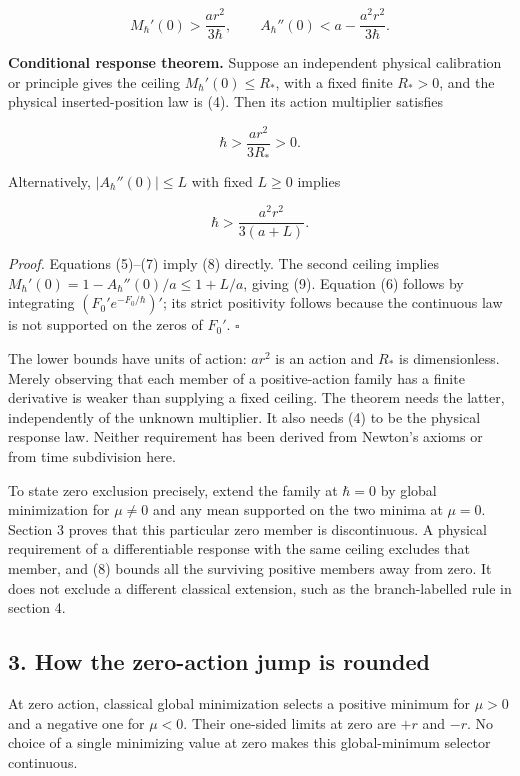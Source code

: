 \documentclass[11pt,a4paper]{article}
\begin{document}
\[
 M_\hbar'(0)>\frac{ar^2}{3\hbar},\qquad
 A_\hbar''(0)<a-\frac{a^2r^2}{3\hbar}.
 \tag{7}
\]

\textbf{Conditional response theorem.} Suppose an independent physical
calibration or principle gives the ceiling \(M_\hbar'(0)\le R_*\), with
a fixed finite \(R_*>0\), and the physical inserted-position law is (4).
Then its action multiplier satisfies

\[\hbar>\frac{ar^2}{3R_*}>0.\tag{8}\]

Alternatively, \(|A_\hbar''(0)|\le L\) with fixed \(L\ge0\) implies

\[\hbar>\frac{a^2r^2}{3(a+L)}.\tag{9}\]

\emph{Proof.} Equations (5)--(7) imply (8) directly. The second ceiling
implies \(M_\hbar'(0)=1-A_\hbar''(0)/a\le1+L/a\), giving (9). Equation
(6) follows by integrating \((F_0'e^{-F_0/\hbar})'\); its strict
positivity follows because the continuous law is not supported on the
zeros of \(F_0'\). \(\square\)

The lower bounds have units of action: \(ar^2\) is an action and \(R_*\)
is dimensionless. Merely observing that each member of a positive-action
family has a finite derivative is weaker than supplying a fixed ceiling.
The theorem needs the latter, independently of the unknown multiplier.
It also needs (4) to be the physical response law. Neither requirement
has been derived from Newton's axioms or from time subdivision here.

To state zero exclusion precisely, extend the family at \(\hbar=0\) by
global minimization for \(\mu\ne0\) and any mean supported on the two
minima at \(\mu=0\). Section 3 proves that this particular zero member
is discontinuous. A physical requirement of a differentiable response
with the same ceiling excludes that member, and (8) bounds all the
surviving positive members away from zero. It does not exclude a
different classical extension, such as the branch-labelled rule in
section 4.

\subsection{3. How the zero-action jump is
rounded}\label{how-the-zero-action-jump-is-rounded}

At zero action, classical global minimization selects a positive minimum
for \(\mu>0\) and a negative one for \(\mu<0\). Their one-sided limits
at zero are \(+r\) and \(-r\). No choice of a single minimizing value at
zero makes this global-minimum selector continuous.
\end{document}
